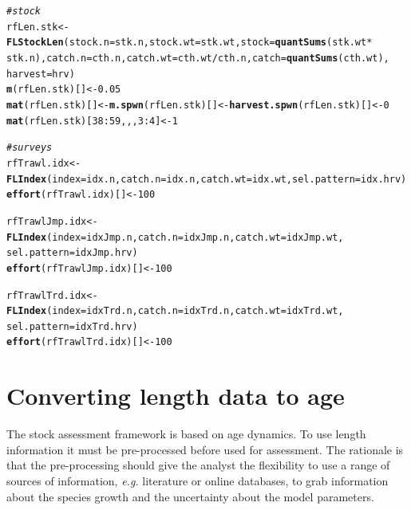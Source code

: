\documentclass[a4paper,english,10pt]{article}\usepackage[]{graphicx}\usepackage[]{color}
\makeatletter
\newcommand{\hlnum}[1]{\textcolor[rgb]{0.686,0.059,0.569}{#1}}%
\newcommand{\hlcom}[1]{\textcolor[rgb]{0.678,0.584,0.686}{\textit{#1}}}%
\newcommand{\hlopt}[1]{\textcolor[rgb]{0,0,0}{#1}}%
\newcommand{\hlstd}[1]{\textcolor[rgb]{0.345,0.345,0.345}{#1}}%
\newcommand{\hlkwb}[1]{\textcolor[rgb]{0.69,0.353,0.396}{#1}}%
\newcommand{\hlkwc}[1]{\textcolor[rgb]{0.333,0.667,0.333}{#1}}%
\newcommand{\hlkwd}[1]{\textcolor[rgb]{0.737,0.353,0.396}{\textbf{#1}}}%
\newenvironment{kframe}{%
 \def\at@end@of@kframe{}%
 \ifinner\ifhmode%
  \def\at@end@of@kframe{\end{minipage}}%
  \begin{minipage}{\columnwidth}%
 \fi\fi%
 \def\FrameCommand##1{\hskip\@totalleftmargin \hskip-\fboxsep
 \colorbox{shadecolor}{##1}\hskip-\fboxsep
     \hskip-\linewidth \hskip-\@totalleftmargin \hskip\columnwidth}%
 \MakeFramed {\advance\hsize-\width
   \@totalleftmargin\z@ \linewidth\hsize
   \@setminipage}}%
 {\par\unskip\endMakeFramed%
 \at@end@of@kframe}
\newenvironment{knitrout}{}{} %
\makeatother
\begin{document}
\begin{knitrout}
\color{fgcolor}\begin{kframe}
\begin{alltt}
\hlcom{# stock}
\hlstd{rfLen.stk} \hlkwb{<-} \hlkwd{FLStockLen}\hlstd{(}\hlkwc{stock.n} \hlstd{= stk.n,} \hlkwc{stock.wt} \hlstd{= stk.wt,} \hlkwc{stock} \hlstd{=} \hlkwd{quantSums}\hlstd{(stk.wt} \hlopt{*}
    \hlstd{stk.n),} \hlkwc{catch.n} \hlstd{= cth.n,} \hlkwc{catch.wt} \hlstd{= cth.wt}\hlopt{/}\hlstd{cth.n,} \hlkwc{catch} \hlstd{=} \hlkwd{quantSums}\hlstd{(cth.wt),}
    \hlkwc{harvest} \hlstd{= hrv)}
\hlkwd{m}\hlstd{(rfLen.stk)[]} \hlkwb{<-} \hlnum{0.05}
\hlkwd{mat}\hlstd{(rfLen.stk)[]} \hlkwb{<-} \hlkwd{m.spwn}\hlstd{(rfLen.stk)[]} \hlkwb{<-} \hlkwd{harvest.spwn}\hlstd{(rfLen.stk)[]} \hlkwb{<-} \hlnum{0}
\hlkwd{mat}\hlstd{(rfLen.stk)[}\hlnum{38}\hlopt{:}\hlnum{59}\hlstd{, , ,} \hlnum{3}\hlopt{:}\hlnum{4}\hlstd{]} \hlkwb{<-} \hlnum{1}

\hlcom{# surveys}
\hlstd{rfTrawl.idx} \hlkwb{<-} \hlkwd{FLIndex}\hlstd{(}\hlkwc{index} \hlstd{= idx.n,} \hlkwc{catch.n} \hlstd{= idx.n,} \hlkwc{catch.wt} \hlstd{= idx.wt,} \hlkwc{sel.pattern} \hlstd{= idx.hrv)}
\hlkwd{effort}\hlstd{(rfTrawl.idx)[]} \hlkwb{<-} \hlnum{100}

\hlstd{rfTrawlJmp.idx} \hlkwb{<-} \hlkwd{FLIndex}\hlstd{(}\hlkwc{index} \hlstd{= idxJmp.n,} \hlkwc{catch.n} \hlstd{= idxJmp.n,} \hlkwc{catch.wt} \hlstd{= idxJmp.wt,}
    \hlkwc{sel.pattern} \hlstd{= idxJmp.hrv)}
\hlkwd{effort}\hlstd{(rfTrawlJmp.idx)[]} \hlkwb{<-} \hlnum{100}

\hlstd{rfTrawlTrd.idx} \hlkwb{<-} \hlkwd{FLIndex}\hlstd{(}\hlkwc{index} \hlstd{= idxTrd.n,} \hlkwc{catch.n} \hlstd{= idxTrd.n,} \hlkwc{catch.wt} \hlstd{= idxTrd.wt,}
    \hlkwc{sel.pattern} \hlstd{= idxTrd.hrv)}
\hlkwd{effort}\hlstd{(rfTrawlTrd.idx)[]} \hlkwb{<-} \hlnum{100}
\end{alltt}
\end{kframe}
\end{knitrout}


\pagebreak
\section{Converting length data to age}

The stock assessment framework is based on age dynamics. To use length information it must be pre-processed before used for assessment. The rationale is that the pre-processing should give the analyst the flexibility to use a range of sources of information, \emph{e.g.} literature or online databases, to grab information about the species growth and the uncertainty about the model parameters.
\end{document}
